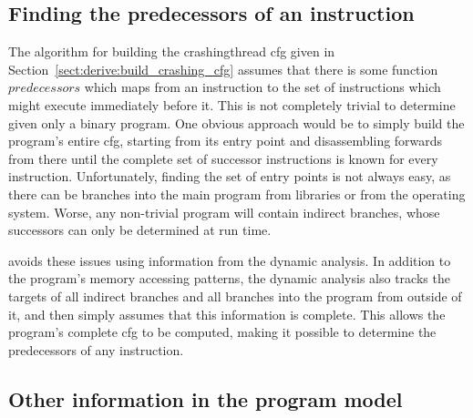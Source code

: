 {

\subsection{Finding the predecessors of an instruction}
\label{sect:program_model:instr_predecessors}


The algorithm for building the \gls{crashingthread} \gls{cfg} given in
Section~\ref{sect:derive:build_crashing_cfg} assumes that there is
some function $\mathit{predecessors}$ which maps from an instruction
to the set of instructions which might execute immediately before it.
This is not completely trivial to determine given only a binary
program.  One obvious approach would be to simply build the program's
entire \gls{cfg}, starting from its entry point and disassembling
forwards from there until the complete set of successor instructions
is known for every instruction.  Unfortunately, finding the set of
entry points is not always easy, as there can be branches into the
main program from libraries or from the operating system.  Worse, any
non-trivial program will contain indirect branches, whose successors
can only be determined at run time.

{\Implementation} avoids these issues using information from the
dynamic analysis.  In addition to the program's memory accessing
patterns, the dynamic analysis also tracks the targets of all indirect
branches and all branches into the program from outside of it, and
then simply assumes that this information is complete.  This allows
the program's complete \gls{cfg} to be computed, making it possible to
determine the predecessors of any instruction.

\subsection{Other information in the program model}

}
